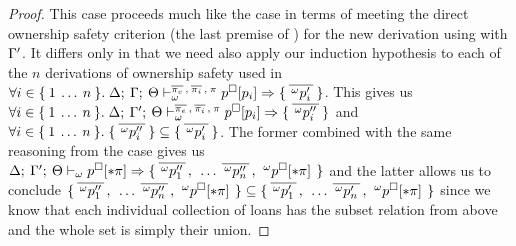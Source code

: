\begin{proof}
  This case proceeds much like the  case in terms of meeting the direct
  ownership safety criterion (the last premise of ) for the new derivation
  using  with $\Gamma^\prime$. It differs only in that we need also apply
  our induction hypothesis to each of the $n$ derivations of ownership safety used in
  $\forall i \in \{ \: 1 \: \ldots \: n \: \}. \;
  \Delta; \: \Gamma; \: \Theta \vdash^{
    \overline{\pi_e} \, , \: \overline{\pi_i} \, , \: \pi
  }_{\omega} 
    p^\square[p_i]
   \Rightarrow 
    \{ \: \overline{\,^{\omega}p_i^\prime\,} \: \}
  $. This gives us
  $\forall i \in \{ \: 1 \: \ldots \: n \: \}. \;
  \Delta; \: \Gamma^\prime; \: \Theta \vdash^{
    \overline{\pi_e} \, , \: \overline{\pi_i} \, , \: \pi
  }_{\omega} 
    p^\square[p_i]
   \Rightarrow 
    \{ \: \overline{\,^{\omega}p_i^{\prime\prime}\,} \: \}
  $ and $\forall i \in \{ \: 1 \: \ldots \: n \: \}. \;
  \{ \: \overline{\,^{\omega}p_i^{\prime\prime}\,} \: \} \subseteq
  \{ \: \overline{\,^{\omega}p_i^\prime\,} \: \}$. The former combined with
  the same reasoning from the  case gives us
  $\Delta; \: \Gamma^\prime; \: \Theta \vdash_{\omega} 
    p^\square[* \pi]
   \Rightarrow 
    \{ \: 
      \overline{\,^{\omega}p^{\prime\prime}_1\,} \, , \:
      \: \ldots \:
      \overline{\,^{\omega}p^{\prime\prime}_n\,} \, , \:
      \,^{\omega}p^\square[* \pi]\,
     \: \}
  $ and the latter allows us to conclude
  $\{ \: 
    \overline{\,^{\omega}p^{\prime\prime}_1\,} \, , \:
    \: \ldots \:
    \overline{\,^{\omega}p^{\prime\prime}_n\,} \, , \:
    \,^{\omega}p^\square[* \pi]\,
   \: \} \subseteq \{ \: 
    \overline{\,^{\omega}p^\prime_1\,} \, , \:
    \: \ldots \:
    \overline{\,^{\omega}p^\prime_n\,} \, , \:
    \,^{\omega}p^\square[* \pi]\,
   \: \}$ since we know that each individual collection of loans has the subset relation from
  above and the whole set is simply their union.

  \vspace{1em}
  \noindent \framebox[\textwidth]{
    \figuresize
    \begin{mathpar}
      \ODerefAbs
    \end{mathpar}
  }
  \vspace{1em}


\end{proof}
